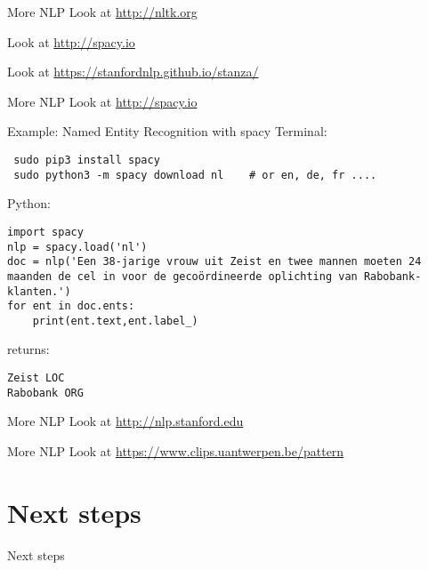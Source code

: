 \documentclass{beamer}
\begin{document}
\begin{frame}{More NLP}
  \Huge{Look at \url{http://nltk.org}}

  \Huge{Look at \url{http://spacy.io}}

  \Huge{Look at \url{https://stanfordnlp.github.io/stanza/}}


\begin{frame}{More NLP}
\Huge{Look at \url{http://spacy.io}}
\end{frame}


\begin{frame}[fragile]{Example: Named Entity Recognition with spacy}
Terminal:

\begin{lstlisting}
 sudo pip3 install spacy
 sudo python3 -m spacy download nl    # or en, de, fr ....
\end{lstlisting}

Python:

\begin{lstlisting}
import spacy
nlp = spacy.load('nl')
doc = nlp('Een 38-jarige vrouw uit Zeist en twee mannen moeten 24 maanden de cel in voor de gecoördineerde oplichting van Rabobank-klanten.')
for ent in doc.ents:
    print(ent.text,ent.label_)
\end{lstlisting}

returns:

\begin{lstlisting}
Zeist LOC
Rabobank ORG
\end{lstlisting}  

\end{frame}



\begin{frame}{More NLP}
\Huge{Look at \url{http://nlp.stanford.edu}}
\end{frame}


\begin{frame}{More NLP}
\Huge{Look at \url{https://www.clips.uantwerpen.be/pattern}}
\end{frame}



\end{frame}




\section{Next steps}

\begin{frame}[plain]
\huge Next steps
  \end{frame}
\end{document}
